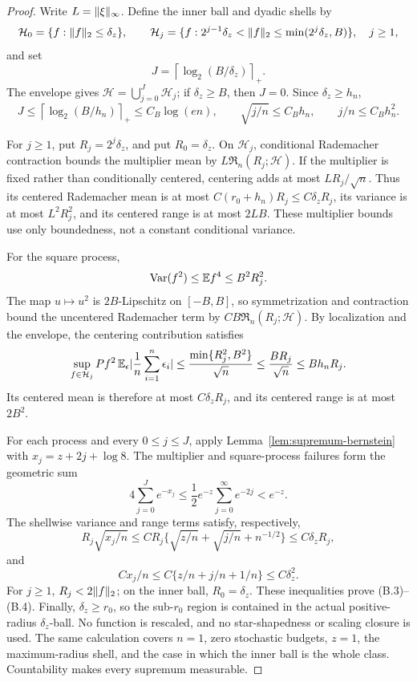 \begin{proof}
Write \(L=\lVert \xi\rVert_\infty\).  Define the inner ball and dyadic shells by
\[
 \mathcal H_0=\{f:\lVert f\rVert_2\le\delta_z\},\qquad
 \mathcal H_j=\{f:2^{j-1}\delta_z<\lVert f\rVert_2
       \le\min(2^j\delta_z,B)\},\quad j\ge1,
\]
and set
\[
 J=\left\lceil\log_2(B/\delta_z)\right\rceil_+.
\]
The envelope gives \(\mathcal H=\bigcup_{j=0}^J\mathcal H_j\); if
\(\delta_z\ge B\), then \(J=0\).  Since \(\delta_z\ge h_n\),
\begin{equation}
 J\le \left\lceil\log_2(B/h_n)\right\rceil_+
 \le C_B\log(en),\qquad
 \sqrt{j/n}\le C_Bh_n,\qquad j/n\le C_Bh_n^2.
 \tag{B.2b}
\end{equation}

For \(j\ge1\), put \(R_j=2^j\delta_z\), and put
\(R_0=\delta_z\).  On \(\mathcal H_j\), conditional Rademacher
contraction bounds the multiplier mean by
\(L\mathfrak R_n(R_j;\mathcal H)\).  If the multiplier is fixed rather
than conditionally centered, centering adds at most \(LR_j/\sqrt n\).
Thus its centered Rademacher mean is at most
\(C(r_0+h_n)R_j\le C\delta_zR_j\), its variance is at most
\(L^2R_j^2\), and its centered range is at most \(2LB\).
These multiplier bounds use only boundedness, not a constant conditional
variance.

For the square process,
\[
 \operatorname{Var}(f^2)\le \mathbb E f^4\le B^2R_j^2.
\]
The map \(u\mapsto u^2\) is \(2B\)-Lipschitz on \([-B,B]\), so
symmetrization and contraction bound the uncentered Rademacher term by
\(CB\mathfrak R_n(R_j;\mathcal H)\).  By localization and the envelope,
the centering contribution satisfies
\[
 \sup_{f\in\mathcal H_j}Pf^2\,\mathbb E_\epsilon
 \lvert \frac1n\sum_{i=1}^n\epsilon_i\rvert
 \le\frac{\min\{R_j^2,B^2\}}{\sqrt n}
 \le\frac{BR_j}{\sqrt n}\le Bh_nR_j.
\]
Its centered mean is therefore at most
\(C\delta_zR_j\), and its centered range is at most \(2B^2\).

For each process and every \(0\le j\le J\), apply
Lemma~\ref{lem:supremum-bernstein} with
\(x_j=z+2j+\log8\).  The multiplier and square-process failures form the
geometric sum
\begin{equation}
 4\sum_{j=0}^Je^{-x_j}
 \le\frac12e^{-z}\sum_{j=0}^\infty e^{-2j}<e^{-z}.
 \tag{B.2c}
\end{equation}
The shellwise variance and range terms satisfy, respectively,
\[
 R_j\sqrt{x_j/n}
 \le CR_j\{\sqrt{z/n}+\sqrt{j/n}+n^{-1/2}\}
 \le C\delta_zR_j,
\]
and
\begin{equation}
 Cx_j/n\le C\{z/n+j/n+1/n\}\le C\delta_z^2.
 \tag{B.2d}
\end{equation}
For \(j\ge1\), \(R_j<2\lVert f\rVert_2\); on the inner ball,
\(R_0=\delta_z\).  These inequalities prove (B.3)--(B.4).
Finally, \(\delta_z\ge r_0\), so the sub-\(r_0\) region is contained in
the actual positive-radius \(\delta_z\)-ball.  No function is rescaled, and
no star-shapedness or scaling closure is used.  The same calculation covers
\(n=1\), zero stochastic budgets, \(z=1\), the maximum-radius shell, and the
case in which the inner ball is the whole class.  Countability makes every
supremum measurable.
\end{proof}

